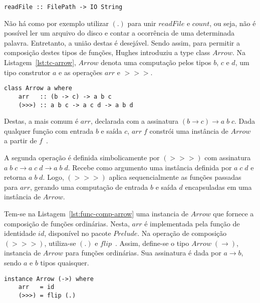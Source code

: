\documentclass[10pt, conference]{IEEEtran}
\begin{document}
\begin{lstlisting}[caption={Funções de E/S\protect\footref{fnt:prog-with-arrows}\protect\footref{fnt:prelude}}, label={lst:func-io}]
readFile :: FilePath -> IO String
\end{lstlisting}

Não há como por exemplo utilizar $(.)$ para unir $readFile$ e $count$, ou seja, não é possível ler um arquivo do disco e contar a ocorrência de uma determinada palavra. Entretanto, a união destas é desejável. Sendo assim, para permitir a composição destes tipos de funções, Hughes introduziu a type class $Arrow$. Na Listagem~\ref{lst:tc-arrow}, $Arrow$ denota uma computação pelos tipos $b$, $c$ e $d$, um tipo construtor $a$ e as operações $arr$ e $>>>$. 

\begin{lstlisting}[caption={Type class $Arrow$\protect\footref{fnt:arrow-user-interface}}, label={lst:tc-arrow}]
class Arrow a where
	arr   :: (b -> c) -> a b c
	(>>>) :: a b c -> a c d -> a b d
\end{lstlisting}

Destas, a mais comum é $arr$, declarada com a assinatura ${(b \rightarrow c) \rightarrow a\;b\;c}$. Dada qualquer função com entrada $b$ e saída $c$, $arr\;f$ constrói uma instância de $Arrow$ a partir de $f$~\cite{courtney2001genuinely}. 

A segunda operação é definida simbolicamente por $(>>>)$ com assinatura ${a\;b\;c \rightarrow a\;c\;d \rightarrow a\;b\;d}$. Recebe como argumento uma instância definida por ${a\;c\;d}$ e retorna $a\;b\;d$. Logo, $(>>>)$ aplica sequencialmente as funções passadas para $arr$, gerando uma computação de entrada $b$ e saída $d$ encapsuladas em uma instância de $Arrow$.

Tem-se na Listagem~\ref{lst:func-comp-arrow} uma instancia de $Arrow$ que fornece a composição de funções ordinárias. Nesta, $arr$ é implementada pela função de identidade $id$, disponível no pacote $Prelude$. Na operação de composição $(>>>)$, utiliza-se $(.)$ e $flip$~\cite{hughes2005programming}. Assim, define-se o tipo ${Arrow\;(\rightarrow)}$,  instancia de $Arrow$ para funções ordinárias. Sua assinatura é dada por $a \rightarrow b$, sendo $a$ e $b$ tipos quaisquer.

\begin{lstlisting}[caption={Arrow - Composição de Funções\protect\footref{fnt:prog-with-arrows}}, label={lst:func-comp-arrow}]
instance Arrow (->) where
	arr   = id
	(>>>) = flip (.)
\end{lstlisting} 
\end{document}
